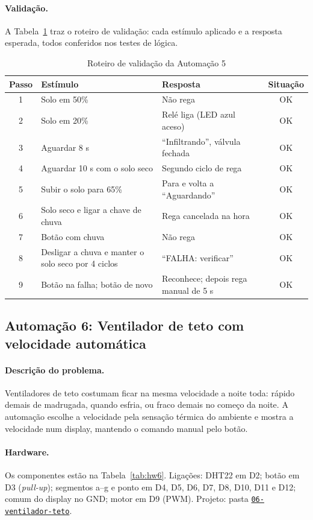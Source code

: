 \documentclass[12pt]{article}
\newcommand{\repositorio}{https://github.com/USUARIO/REPOSITORIO}
\newcommand{\pasta}[1]{\href{\repositorio/tree/main/#1}{\texttt{#1}}}
\begin{document}
\paragraph{Validação.} A Tabela~\ref{tab:val5} traz o roteiro de validação: cada estímulo aplicado e a resposta esperada, todos conferidos nos testes de lógica.

\begin{table}[ht]
\centering
\caption{Roteiro de validação da Automação 5}\label{tab:val5}
\footnotesize
\begin{tabularx}{\textwidth}{cXXc}
\toprule
Passo & Estímulo & Resposta & Situação \\
\midrule
1 & Solo em 50\% & Não rega & OK \\
2 & Solo em 20\% & Relé liga (LED azul aceso) & OK \\
3 & Aguardar 8 s & ``Infiltrando'', válvula fechada & OK \\
4 & Aguardar 10 s com o solo seco & Segundo ciclo de rega & OK \\
5 & Subir o solo para 65\% & Para e volta a ``Aguardando'' & OK \\
6 & Solo seco e ligar a chave de chuva & Rega cancelada na hora & OK \\
7 & Botão com chuva & Não rega & OK \\
8 & Desligar a chuva e manter o solo seco por 4 ciclos & ``FALHA: verificar'' & OK \\
9 & Botão na falha; botão de novo & Reconhece; depois rega manual de 5 s & OK \\
\bottomrule
\end{tabularx}
\end{table}

\subsection{Automação 6: Ventilador de teto com velocidade automática}\label{sub:a6}

\paragraph{Descrição do problema.} Ventiladores de teto costumam ficar na mesma velocidade a noite toda: rápido demais de madrugada, quando esfria, ou fraco demais no começo da noite. A automação escolhe a velocidade pela sensação térmica do ambiente e mostra a velocidade num display, mantendo o comando manual pelo botão.

\paragraph{Hardware.} Os componentes estão na Tabela~\ref{tab:hw6}. Ligações: DHT22 em D2; botão em D3 (\emph{pull-up}); segmentos a--g e ponto em D4, D5, D6, D7, D8, D10, D11 e D12; comum do display no GND; motor em D9 (PWM). Projeto: pasta \pasta{06-ventilador-teto}.
\end{document}
